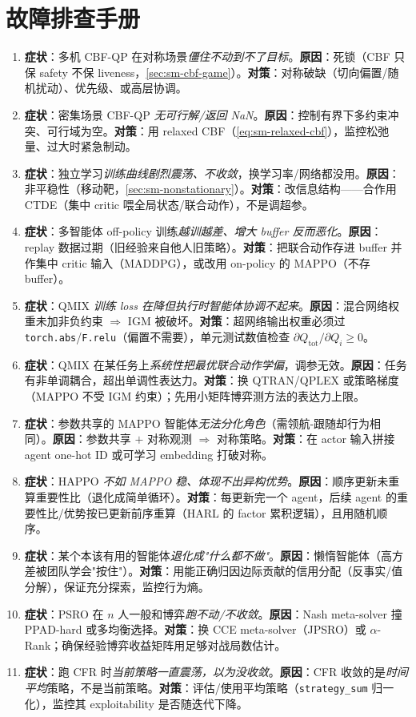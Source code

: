 \section*{故障排查手册}
\begin{enumerate}
  \item \textbf{症状}：多机 CBF-QP 在对称场景\emph{僵住不动到不了目标}。\textbf{原因}：死锁（CBF 只保 safety 不保 liveness，\cref{sec:sm-cbf-game}）。\textbf{对策}：对称破缺（切向偏置/随机扰动）、优先级、或高层协调。
  \item \textbf{症状}：密集场景 CBF-QP \emph{无可行解/返回 NaN}。\textbf{原因}：控制有界下多约束冲突、可行域为空。\textbf{对策}：用 relaxed CBF（\cref{eq:sm-relaxed-cbf}），监控松弛量、过大时紧急制动。
  \item \textbf{症状}：独立学习\emph{训练曲线剧烈震荡、不收敛}，换学习率/网络都没用。\textbf{原因}：非平稳性（移动靶，\cref{sec:sm-nonstationary}）。\textbf{对策}：改信息结构——合作用 CTDE（集中 critic 喂全局状态/联合动作），不是调超参。
  \item \textbf{症状}：多智能体 off-policy 训练\emph{越训越差、增大 buffer 反而恶化}。\textbf{原因}：replay 数据过期（旧经验来自他人旧策略）。\textbf{对策}：把联合动作存进 buffer 并作集中 critic 输入（MADDPG），或改用 on-policy 的 MAPPO（不存 buffer）。
  \item \textbf{症状}：QMIX \emph{训练 loss 在降但执行时智能体协调不起来}。\textbf{原因}：混合网络权重未加非负约束 $\Rightarrow$ IGM 被破坏。\textbf{对策}：超网络输出权重必须过 \texttt{torch.abs}/\texttt{F.relu}（偏置不需要），单元测试数值检查 $\partial Q_{\text{tot}}/\partial Q_i\ge0$。
  \item \textbf{症状}：QMIX 在某任务上\emph{系统性把最优联合动作学偏}，调参无效。\textbf{原因}：任务有非单调耦合，超出单调性表达力。\textbf{对策}：换 QTRAN/QPLEX 或策略梯度（MAPPO 不受 IGM 约束）；先用小矩阵博弈测方法的表达力上限。
  \item \textbf{症状}：参数共享的 MAPPO 智能体\emph{无法分化角色}（需领航-跟随却行为相同）。\textbf{原因}：参数共享 $+$ 对称观测 $\Rightarrow$ 对称策略。\textbf{对策}：在 actor 输入拼接 agent one-hot ID 或可学习 embedding 打破对称。
  \item \textbf{症状}：HAPPO \emph{不如 MAPPO 稳、体现不出异构优势}。\textbf{原因}：顺序更新未重算重要性比（退化成简单循环）。\textbf{对策}：每更新完一个 agent，后续 agent 的重要性比/优势按已更新前序重算（HARL 的 factor 累积逻辑），且用随机顺序。
  \item \textbf{症状}：某个本该有用的智能体\emph{退化成"什么都不做"}。\textbf{原因}：懒惰智能体（高方差被团队学会"按住"）。\textbf{对策}：用能正确归因边际贡献的信用分配（反事实/值分解），保证充分探索，监控行为熵。
  \item \textbf{症状}：PSRO 在 $n$ 人一般和博弈\emph{跑不动/不收敛}。\textbf{原因}：Nash meta-solver 撞 PPAD-hard 或多均衡选择。\textbf{对策}：换 CCE meta-solver（JPSRO）或 $\alpha$-Rank；确保经验博弈收益矩阵用足够对战局数估计。
  \item \textbf{症状}：跑 CFR 时\emph{当前策略一直震荡，以为没收敛}。\textbf{原因}：CFR 收敛的是\emph{时间平均}策略，不是当前策略。\textbf{对策}：评估/使用平均策略（\texttt{strategy\_sum} 归一化），监控其 exploitability 是否随迭代下降。
\end{enumerate}
